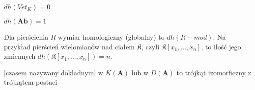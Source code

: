\begin{example}
\item $dh(Vet_K)=0$
\item $dh(\mathbf{Ab})=1$
\item Dla pierścienia $R$ wymiar homologiczny (globalny) to $dh(R-mod)$. Na przykład pierścień wielomianów nad ciałem $\mathfrak{K}$, czyli $\mathfrak{K}[x_1,...,x_n]$, to ilość jego zmiennych $dh(\mathfrak{K}[x_1,..., x_n])=n$.
\end{example}

\begin{definition}
   [czasem nazywany dokladnym] w $K(\mathbf{A})$ lub w $D(\mathbf{A})$ to trójkąt izomorficzny z trójkątem postaci
  \begin{center}\end{center}
\end{definition}

